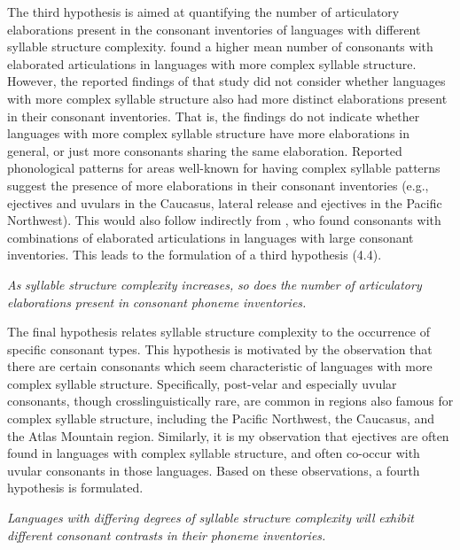   The third hypothesis is aimed at quantifying the number of articulatory elaborations present in the consonant inventories of languages with different syllable structure complexity. \citet{MaddiesonEtAl2013} found a higher mean number of consonants with elaborated articulations in languages with more complex syllable structure. However, the reported findings of that study did not consider whether languages with more complex syllable structure also had more distinct elaborations present in their consonant inventories. That is, the findings do not indicate whether languages with more complex syllable structure have more elaborations in general, or just more consonants sharing the same elaboration. Reported phonological patterns for areas well-known for having complex syllable patterns suggest the presence of more elaborations in their consonant inventories (e.g., ejectives and uvulars in the Caucasus, lateral release and ejectives in the Pacific Northwest). This would also follow indirectly from \citet{LindblomMaddieson1988}, who found consonants with combinations of elaborated articulations in languages with large consonant inventories. This leads to the formulation of a third hypothesis (4.4).



\ea\label{ex:(4.4)}
  \textit{As} \textit{syllable} \textit{structure} \textit{complexity} \textit{increases,} \textit{so} \textit{does} \textit{the} \textit{number} \textit{of} \textit{articulatory} \textit{elaborations} \textit{present} \textit{in} \textit{consonant} \textit{phoneme} \textit{inventories.}
\z



  The final hypothesis relates syllable structure complexity to the occurrence of specific consonant types. This hypothesis is motivated by the observation that there are certain consonants which seem characteristic of languages with more complex syllable structure. Specifically, post-velar and especially uvular consonants, though crosslinguistically rare, are common in regions also famous for complex syllable structure, including the Pacific Northwest, the Caucasus, and the Atlas Mountain region. Similarly, it is my observation that ejectives are often found in languages with complex syllable structure, and often co-occur with uvular consonants in those languages. Based on these observations, a fourth hypothesis is formulated.



\ea\label{ex:(4.5)}
  \textit{Languages} \textit{with} \textit{differing} \textit{degrees} \textit{of} \textit{syllable} \textit{structure} \textit{complexity} \textit{will} \textit{exhibit} \textit{different} \textit{consonant} \textit{contrasts} \textit{in} \textit{their} \textit{phoneme} \textit{inventories.}
\z



